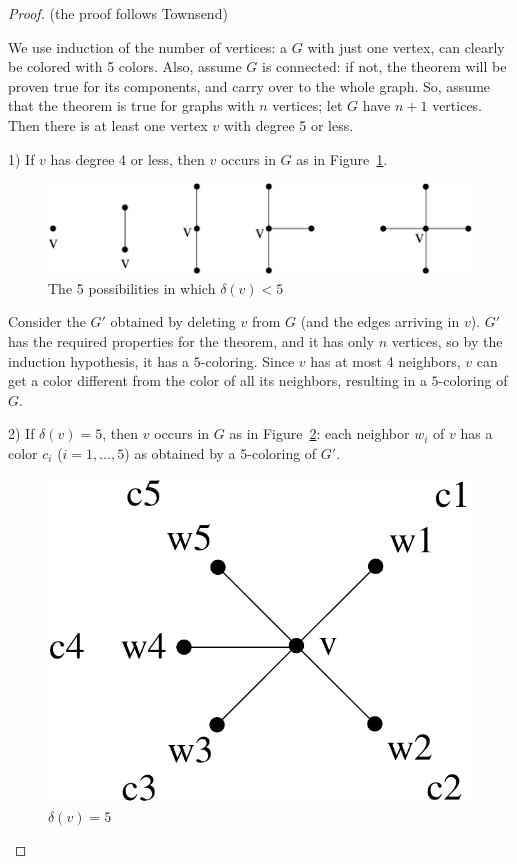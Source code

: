 \begin{proof} (the proof follows Townsend)

We use induction of the number of vertices: a $G$ with just one vertex,
can clearly be colored with 5 colors. Also, assume $G$ is connected:
if not, the theorem will be proven true for its components, and carry
over to the whole graph. So, assume that the theorem is true for
graphs with $n$ vertices; let $G$ have $n+1$ vertices. Then there is
at least one vertex $v$ with degree 5 or less.

1) If $v$ has degree 4 or less, then $v$ occurs in $G$ as in
Figure~\ref{5kleuring1}.

\begin{figure}[ht]
\begin{center}
\includegraphics[width=0.6\linewidth,keepaspectratio]{5kleuring1}
\end{center}
\caption{The 5 possibilities in which $\delta(v) < 5$ \label{5kleuring1}}
\end{figure}

Consider the $G'$ obtained by deleting $v$ from $G$ (and the edges
arriving in $v$). $G'$ has the required properties for the theorem,
and it has only $n$ vertices, so by the induction hypothesis, it has a
$5$-coloring. Since $v$ has at most 4 neighbors, $v$ can get a color
different from the color of all its neighbors, resulting in a
$5$-coloring of $G$.

2) If $\delta(v) = 5$, then $v$ occurs in $G$ as in
Figure~\ref{5kleuring2}: each neighbor $w_{i}$ of $v$ has a color
$c_{i}$ ($i = 1,\ldots,5$) as obtained by a $5$-coloring of $G'$.

\begin{figure}[ht]
\begin{center}
\includegraphics[width=0.25\linewidth,keepaspectratio]{5kleuring2}
\end{center}
\caption{$\delta(v) = 5$ \label{5kleuring2}}
\end{figure}


\end{proof}
